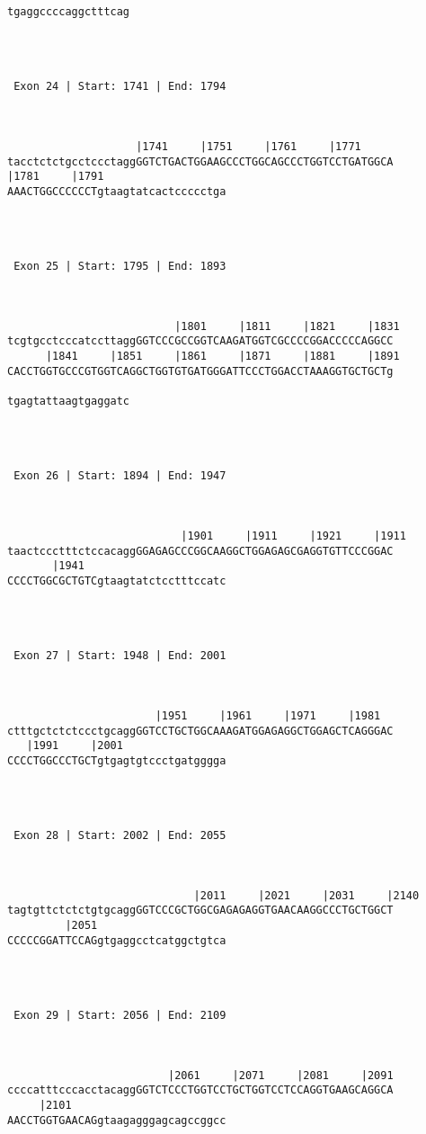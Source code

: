\documentclass{article}
\begin{document}
\begin{Verbatim}
tgaggccccaggctttcag




 Exon 24 | Start: 1741 | End: 1794 



                    |1741     |1751     |1761     |1771     
tacctctctgcctccctaggGGTCTGACTGGAAGCCCTGGCAGCCCTGGTCCTGATGGCA
|1781     |1791                   
AAACTGGCCCCCCTgtaagtatcactccccctga




 Exon 25 | Start: 1795 | End: 1893 



                          |1801     |1811     |1821     |1831
tcgtgcctcccatccttaggGGTCCCGCCGGTCAAGATGGTCGCCCCGGACCCCCAGGCC
      |1841     |1851     |1861     |1871     |1881     |1891
CACCTGGTGCCCGTGGTCAGGCTGGTGTGATGGGATTCCCTGGACCTAAAGGTGCTGCTg
                   
tgagtattaagtgaggatc




 Exon 26 | Start: 1894 | End: 1947 



                           |1901     |1911     |1921     |1911
taactccctttctccacaggGGAGAGCCCGGCAAGGCTGGAGAGCGAGGTGTTCCCGGAC
       |1941                      
CCCCTGGCGCTGTCgtaagtatctcctttccatc




 Exon 27 | Start: 1948 | End: 2001 



                       |1951     |1961     |1971     |1981  
ctttgctctctccctgcaggGGTCCTGCTGGCAAAGATGGAGAGGCTGGAGCTCAGGGAC
   |1991     |2001                
CCCCTGGCCCTGCTgtgagtgtccctgatgggga




 Exon 28 | Start: 2002 | End: 2055 



                             |2011     |2021     |2031     |2140
tagtgttctctctgtgcaggGGTCCCGCTGGCGAGAGAGGTGAACAAGGCCCTGCTGGCT
         |2051                    
CCCCCGGATTCCAGgtgaggcctcatggctgtca




 Exon 29 | Start: 2056 | End: 2109 



                         |2061     |2071     |2081     |2091
ccccatttcccacctacaggGGTCTCCCTGGTCCTGCTGGTCCTCCAGGTGAAGCAGGCA
     |2101                        
AACCTGGTGAACAGgtaagagggagcagccggcc





\end{Verbatim}
\end{document}
